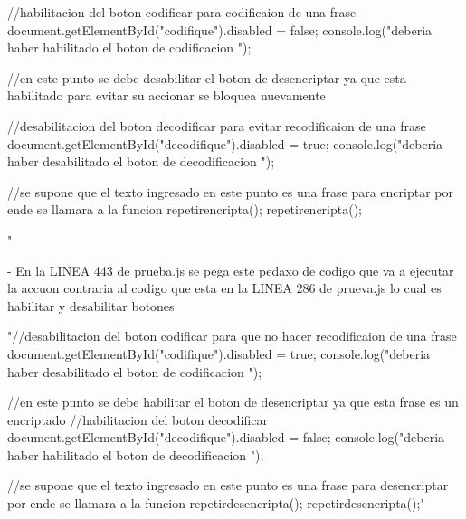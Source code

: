 {{                                //habilitacion del boton codificar para codificaion de una frase 
                                document.getElementById("codifique").disabled = false;
                                console.log("deberia haber habilitado el boton de codificacion ");

                                //en este punto se debe desabilitar el boton de desencriptar ya que esta habilitado para evitar su accionar se bloquea nuevamente
                                
                                //desabilitacion del boton decodificar para evitar recodificaion de una frase 
                                document.getElementById("decodifique").disabled = true;
                                console.log("deberia haber desabilitado el boton de decodificacion ");  
                            
                            
                                //se supone que el texto ingresado en este punto es una frase para encriptar por ende se llamara a la funcion repetirencripta();
                                repetirencripta();
                            }
                        } "

            - En la LINEA 443 de prueba.js se pega este pedaxo de codigo que va a ejecutar la accuon contraria al codigo que esta en la LINEA 286 de prueva.js lo cual es habilitar y desabilitar botones 
                            
                                "//desabilitacion del boton codificar para que no hacer recodificaion de una frase 
                                document.getElementById("codifique").disabled = true;
                                console.log("deberia haber desabilitado el boton de codificacion ");

                                //en este punto se debe habilitar el boton de desencriptar ya que esta frase es un encriptado
                                //habilitacion del boton decodificar 
                                document.getElementById("decodifique").disabled = false;
                                console.log("deberia haber habilitado el boton de decodificacion ");  
                                    
                                //se supone que el texto ingresado en este punto es una frase para desencriptar por ende se llamara a la funcion repetirdesencripta();
                                repetirdesencripta();"

